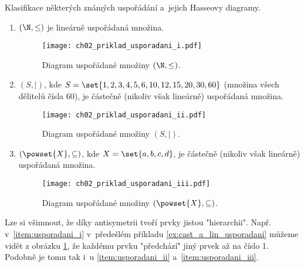 \begin{example}\label{ex:cast_a_lin_usporadani}
    Klasifikace některých známých uspořádání a~jejich Hasseovy diagramy.
    \begin{enumerate}[label=(\roman*)]
        \item\label{item:usporadani_i} $(\N,\leq)$ je lineárně uspořádaná množina.
        \begin{figure}[H]
            \centering
            \texttt{[image: ch02\_priklad\_usporadani\_i.pdf]}
            \caption{Diagram uspořádané množiny $(\N,\leq)$.}
            \label{fig:priklad_usporadani_i}
        \end{figure}
        \item\label{item:usporadani_ii} $(S,\mid)$, kde $S=\set{1, 2, 3, 4, 5, 6, 10, 12, 15, 20, 30, 60}$ (množina všech dělitelů čísla 60), je částečně (nikoliv však lineárně) uspořádaná množina.
        \begin{figure}[H]
            \centering
            \texttt{[image: ch02\_priklad\_usporadani\_ii.pdf]}
            \caption{Diagram uspořádané množiny $(S,\mid)$.}
            \label{fig:priklad_usporadani_ii}
        \end{figure}
        \item\label{item:usporadani_iii} $(\powset{X}, \subseteq)$, kde $X=\set{a,b,c,d}$, je částečně (nikoliv však lineárně) uspořádaná množina.
        \begin{figure}[H]
            \centering
            \texttt{[image: ch02\_priklad\_usporadani\_iii.pdf]}
            \caption{Diagram uspořádané množiny $(\powset{X}, \subseteq)$.}
            \label{fig:priklad_usporadani_iii}
        \end{figure}
    \end{enumerate}
\end{example}
Lze si všimnout, že díky antisymetrii tvoří prvky jistou "hierarchii". Např. v~\ref{item:usporadani_i} v~předešlém příkladu \ref{ex:cast_a_lin_usporadani} můžeme vidět z obrázku \ref{fig:priklad_usporadani_i}, že každému prvku "předchází" jiný prvek až na číslo 1. Podobně je tomu tak i~u \ref{item:usporadani_ii} a~\ref{item:usporadani_iii}. %
